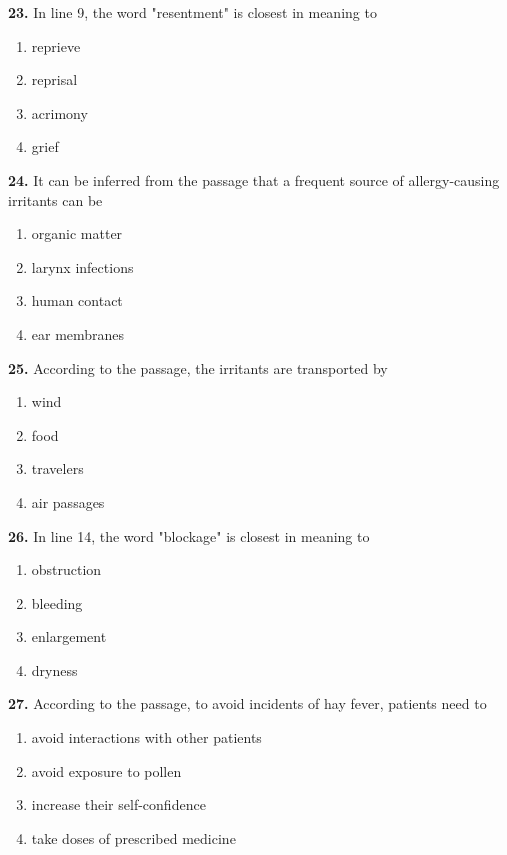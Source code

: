 \documentclass[12pt]{article}
\begin{document}
\par
\vspace{0.25\baselineskip}
\noindent\textbf{23.} In line 9, the word "resentment" is closest in meaning to
\begin{enumerate}[label=(\Alph*),leftmargin=*,itemsep=0.2em]
\item reprieve
\item reprisal
\item acrimony
\item grief
\end{enumerate}
\par
\vspace{0.25\baselineskip}
\noindent\textbf{24.} It can be inferred from the passage that a frequent source of allergy-causing irritants can be
\begin{enumerate}[label=(\Alph*),leftmargin=*,itemsep=0.2em]
\item organic matter
\item larynx infections
\item human contact
\item ear membranes
\end{enumerate}
\par
\vspace{0.25\baselineskip}
\noindent\textbf{25.} According to the passage, the irritants are transported by
\begin{enumerate}[label=(\Alph*),leftmargin=*,itemsep=0.2em]
\item wind
\item food
\item travelers
\item air passages
\end{enumerate}
\par
\vspace{0.25\baselineskip}
\noindent\textbf{26.} In line 14, the word "blockage" is closest in meaning to
\begin{enumerate}[label=(\Alph*),leftmargin=*,itemsep=0.2em]
\item obstruction
\item bleeding
\item enlargement
\item dryness
\end{enumerate}
\par
\vspace{0.25\baselineskip}
\noindent\textbf{27.} According to the passage, to avoid incidents of hay fever, patients need to
\begin{enumerate}[label=(\Alph*),leftmargin=*,itemsep=0.2em]
\item avoid interactions with other patients
\item avoid exposure to pollen
\item increase their self-confidence
\item take doses of prescribed medicine
\end{enumerate}
\end{document}
